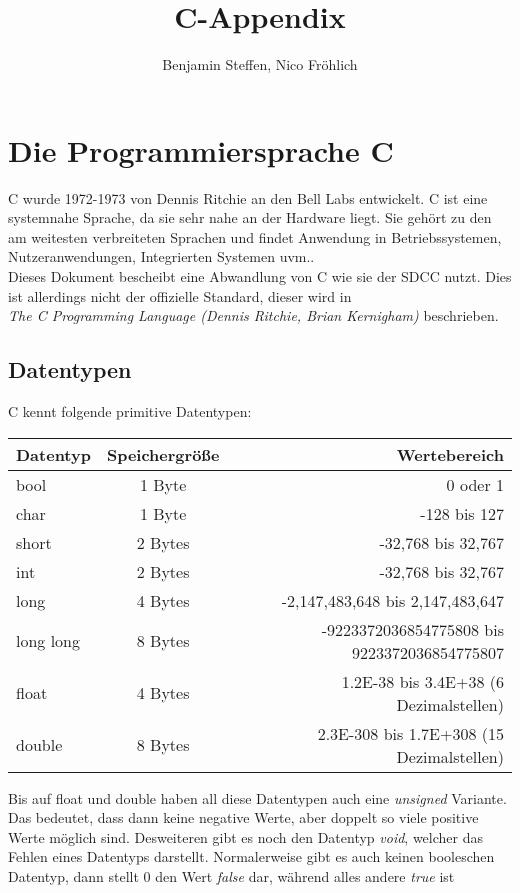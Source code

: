 \documentclass{article}
\begin{document}
\title{C-Appendix}
\author{Benjamin Steffen, Nico Fröhlich}
\maketitle
\clearpage

\tableofcontents

\newpage

\section{Die Programmiersprache C}
C wurde 1972-1973 von Dennis Ritchie an den Bell Labs entwickelt. C ist eine systemnahe Sprache, da sie sehr nahe an der Hardware liegt. Sie gehört zu den am weitesten verbreiteten Sprachen und findet Anwendung in Betriebssystemen,
Nutzeranwendungen,  Integrierten Systemen uvm..\\
Dieses Dokument bescheibt eine Abwandlung von C wie sie der SDCC nutzt. Dies ist allerdings nicht der offizielle Standard, dieser wird in \\\textit{The C Programming Language (Dennis Ritchie, Brian Kernigham)} beschrieben.

\subsection{Datentypen}
C kennt folgende primitive Datentypen:
\begin{center}
\begin{tabular}{| l | c | r |}
	\hline
	\textbf{Datentyp} & \textbf{Speichergr{\"o}{\ss}e} & \textbf{Wertebereich} \\ \hline
    bool & 1 Byte & 0 oder 1 \\
	char & 1 Byte & -128 bis 127 \\
	short & 2 Bytes & -32,768 bis 32,767 \\
	int & 2 Bytes &  -32,768 bis 32,767 \\
	long & 4 Bytes & -2,147,483,648 bis 2,147,483,647 \\
	long long & 8 Bytes & -9223372036854775808 bis 9223372036854775807 \\
	float & 4 Bytes & 1.2E-38 bis 3.4E+38 (6 Dezimalstellen) \\
	double & 8 Bytes & 2.3E-308 bis 1.7E+308 (15 Dezimalstellen) \\
	\hline
\end{tabular}
\end{center}
Bis auf float und double haben all diese Datentypen auch eine \textit{unsigned} Variante. Das bedeutet, dass dann keine negative Werte, aber doppelt so viele positive Werte möglich sind. Desweiteren gibt es noch den Datentyp \textit{void}, welcher das Fehlen eines Datentyps darstellt.
Normalerweise gibt es auch keinen booleschen Datentyp, dann stellt 0 den Wert \textit{false} dar, während alles andere \textit{true} ist
\end{document}
